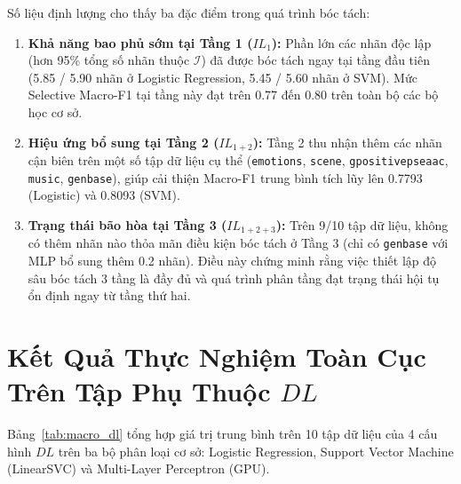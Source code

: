 \documentclass[11pt,a4paper]{article}
\begin{document}
Số liệu định lượng cho thấy ba đặc điểm trong quá trình bóc tách:
\begin{enumerate}[leftmargin=*]
  \item \textbf{Khả năng bao phủ sớm tại Tầng 1 ($IL_1$):} Phần lớn các nhãn độc lập (hơn 95\% tổng số nhãn thuộc $\mathcal{I}$) đã được bóc tách ngay tại tầng đầu tiên (5.85 / 5.90 nhãn ở Logistic Regression, 5.45 / 5.60 nhãn ở SVM). Mức Selective Macro-F1 tại tầng này đạt trên 0.77 đến 0.80 trên toàn bộ các bộ học cơ sở.
  \item \textbf{Hiệu ứng bổ sung tại Tầng 2 ($IL_{1+2}$):} Tầng 2 thu nhận thêm các nhãn cận biên trên một số tập dữ liệu cụ thể (\texttt{emotions}, \texttt{scene}, \texttt{gpositivepseaac}, \texttt{music}, \texttt{genbase}), giúp cải thiện Macro-F1 trung bình tích lũy lên 0.7793 (Logistic) và 0.8093 (SVM).
  \item \textbf{Trạng thái bão hòa tại Tầng 3 ($IL_{1+2+3}$):} Trên 9/10 tập dữ liệu, không có thêm nhãn nào thỏa mãn điều kiện bóc tách ở Tầng 3 (chỉ có \texttt{genbase} với MLP bổ sung thêm 0.2 nhãn). Điều này chứng minh rằng việc thiết lập độ sâu bóc tách 3 tầng là đầy đủ và quá trình phân tầng đạt trạng thái hội tụ ổn định ngay từ tầng thứ hai.
\end{enumerate}

\section{Kết Quả Thực Nghiệm Toàn Cục Trên Tập Phụ Thuộc \texorpdfstring{$DL$}{DL}}
Bảng~\ref{tab:macro_dl} tổng hợp giá trị trung bình trên 10 tập dữ liệu của 4 cấu hình $DL$ trên ba bộ phân loại cơ sở: Logistic Regression, Support Vector Machine (LinearSVC) và Multi-Layer Perceptron (GPU).
\end{document}
